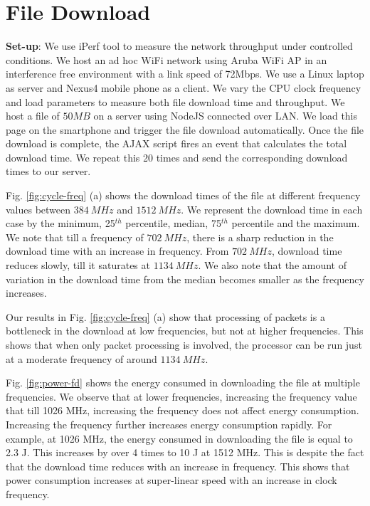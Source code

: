 \section{File Download} \label{label:filedownload}
\textbf{Set-up}:
We use iPerf tool to measure the network throughput under controlled conditions. We host an ad hoc WiFi network using Aruba WiFi AP in an interference free environment with a link speed of 72Mbps.
We use a Linux laptop as server and Nexus4 mobile phone as a client.
We vary the CPU clock frequency and load parameters to measure both file download time and throughput.
We host a file of $50 MB$ on a server using NodeJS connected over LAN.
We load this page on the smartphone and trigger the file download automatically. Once the file download is complete, the AJAX script fires an event that calculates the total download time.
We repeat this 20 times and send the corresponding download times to our server.

Fig. \ref{fig:cycle-freq} (a) shows the download times of the file at different frequency values between $384 \ MHz$ and $1512 \ MHz$. We represent the download time in each case by the minimum, 25$^{th}$ percentile, median, 75$^{th}$ percentile and the maximum. We note that till a frequency of $702 \ MHz$, there is a sharp reduction in the download time with an increase in frequency. From $702 \ MHz$, download time reduces slowly, till it saturates at $1134 \ MHz$. We also note that the amount of variation in the download time from the median becomes smaller as the frequency increases.

Our results in Fig. \ref{fig:cycle-freq} (a) show that processing of packets is a bottleneck in the download at low frequencies, but not at higher frequencies. This shows that when only packet processing is involved, the processor can be run just at a moderate frequency of around $1134 \ MHz$.

Fig. \ref{fig:power-fd} shows the energy consumed in downloading the file at multiple frequencies. We observe that at lower frequencies, increasing the frequency value that till 1026 MHz, increasing the frequency does not affect energy consumption. Increasing the frequency further increases energy consumption rapidly. For example, at 1026 MHz, the energy consumed in downloading the file is equal to 2.3 J. This increases by over 4 times to 10 J at 1512 MHz. This is despite the fact that the download time reduces with an increase in frequency. This shows that power consumption increases at super-linear speed with an increase in clock frequency.

